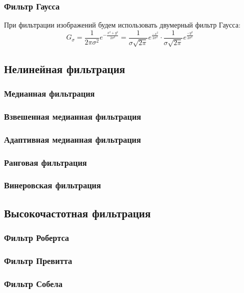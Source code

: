 \newpage

\subsubsection{Фильтр Гаусса}
При фильтрации изображений будем использовать двумерный фильтр Гаусса:
\begin{equation}
   G_\sigma = \frac{1}{2\pi\sigma^2} e^{-\frac{x^2+y^2}{2\sigma^2}} = \frac{1}{\sigma\sqrt{2\pi}} e^{\frac{-x^2}{2\sigma^2}} \cdot \frac{1}{\sigma\sqrt{2\pi}} e^{\frac{-y^2}{2\sigma^2}}
\end{equation}


\subsection{Нелинейная фильтрация}
\subsubsection{Медианная фильтрация}

\subsubsection{Взвешенная медианная фильтрация}
\subsubsection{Адаптивная медианная фильтрация}
\subsubsection{Ранговая фильтрация}
\subsubsection{Винеровская фильтрация}

\subsection{Высокочастотная фильтрация}
\subsubsection{Фильтр Робертса}
\newpage
\subsubsection{Фильтр Превитта}
\subsubsection{Фильтр Собела}
